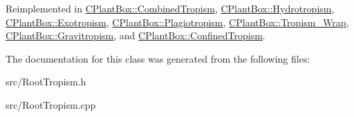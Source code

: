 Reimplemented in \hyperlink{classCPlantBox_1_1CombinedTropism_a9ed761842ac79d92c15f9a88fc2df995}{C\+Plant\+Box\+::\+Combined\+Tropism}, \hyperlink{classCPlantBox_1_1Hydrotropism_a5f259c82922f6d62df17f07827db0338}{C\+Plant\+Box\+::\+Hydrotropism}, \hyperlink{classCPlantBox_1_1Exotropism_a2049c4f5a375d90c05e9995df2e01542}{C\+Plant\+Box\+::\+Exotropism}, \hyperlink{classCPlantBox_1_1Plagiotropism_a4bd7b5b8a2864e78b06f2f27c7642253}{C\+Plant\+Box\+::\+Plagiotropism}, \hyperlink{classCPlantBox_1_1Tropism__Wrap_a00aba49f282f1013a15f9244c263be09}{C\+Plant\+Box\+::\+Tropism\+\_\+\+Wrap}, \hyperlink{classCPlantBox_1_1Gravitropism_a4471a30549db829fe19a91650ca8f87e}{C\+Plant\+Box\+::\+Gravitropism}, and \hyperlink{classCPlantBox_1_1ConfinedTropism_aaa264e2b61755ecaf9baf5f6c43487e0}{C\+Plant\+Box\+::\+Confined\+Tropism}.



The documentation for this class was generated from the following files\+:\begin{DoxyCompactItemize}
\item 
src/Root\+Tropism.\+h\item 
src/Root\+Tropism.\+cpp\end{DoxyCompactItemize}

